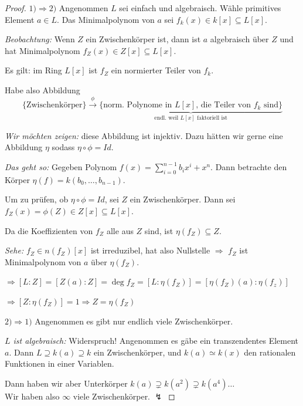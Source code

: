 \documentclass[a4paper,12pt,numbers=noenddot,parskip=full]{scrartcl}
\newcommand{\heading}{\underline}
\theoremstyle{dotless}
\theoremstyle{remark}
\begin{document}
	\begin{proof}
		\heading{$1) \Rightarrow 2)$} Angenommen $L$ sei einfach und algebraisch. Wähle primitives Element $a \in L$. Das Minimalpolynom von $a$ sei $f_k(x) \in k[x] \subseteq L[x]$.
		
		\textit{Beobachtung:} Wenn $Z$ ein Zwischenkörper ist, dann ist $a$ algebraisch über $Z$ und hat Minimalpolynom $f_Z(x) \in Z[x] \subseteq L[x]$.
		
		Es gilt: im Ring $L[x]$ ist $f_Z$ ein normierter Teiler von $f_k$.
		
		Habe also Abbildung
		\begin{equation*}
			\{ \text{Zwischenkörper} \} \overset{\phi}{\to} \underbrace{\{ \text{norm. Polynome in $L[x]$, die Teiler von $f_k$ sind} \}}_{\text{endl. weil $L[x]$ faktoriell ist}}
		\end{equation*}
		
		\textit{Wir möchten zeigen:} diese Abbildung ist injektiv. Dazu hätten wir gerne eine Abbildung $\eta$ sodass $\eta \circ \phi = Id$.
		
		\textit{Das geht so:} Gegeben Polynom $f(x) = \sum_{i = 0}^{n-1} b_i x^i + x^n$. Dann betrachte den Körper $\eta(f) = k(b_0, \dots, b_{n-1})$.
		
		Um zu prüfen, ob $\eta \circ \phi = Id$, sei $Z$ ein Zwischenkörper. Dann sei $f_Z(x) = \phi(Z) \in Z[x] \subseteq L[x]$.
		
		Da die Koeffizienten von $f_Z$ alle aus $Z$ sind, ist $\eta(f_Z) \subseteq Z$.
		
		\textit{Sehe:} $f_Z \in n(f_Z)[x]$ ist irreduzibel, hat also Nullstelle $\Rightarrow$ $f_Z$ ist Minimalpolynom von $a$ über $\eta(f_Z)$.
		
		$\Rightarrow [L:Z] = [Z(a):Z] = \deg f_Z = [L: \eta(f_Z)] = [\eta(f_Z)(a): \eta(f_z)]$
		
		$\Rightarrow [Z:\eta(f_Z)] = 1 \Rightarrow Z = \eta(f_Z)$
		
		\heading{$2) \Rightarrow 1)$} Angenommen es gibt nur endlich viele Zwischenkörper.
		
		\textit{$L$ ist algebraisch:} Widerspruch! Angenommen es gäbe ein transzendentes Element $a$. Dann $L \supseteq k(a) \supseteq k$ ein Zwischenkörper, und $k(a) \simeq k(x)$ den rationalen Funktionen in einer Variablen.
		
		Dann haben wir aber Unterkörper $k(a) \supsetneq k(a^2) \supsetneq k(a^4) \dots$\\ Wir haben also $\infty$ viele Zwischenkörper. $\lightning$
		

\end{proof}
\end{document}
